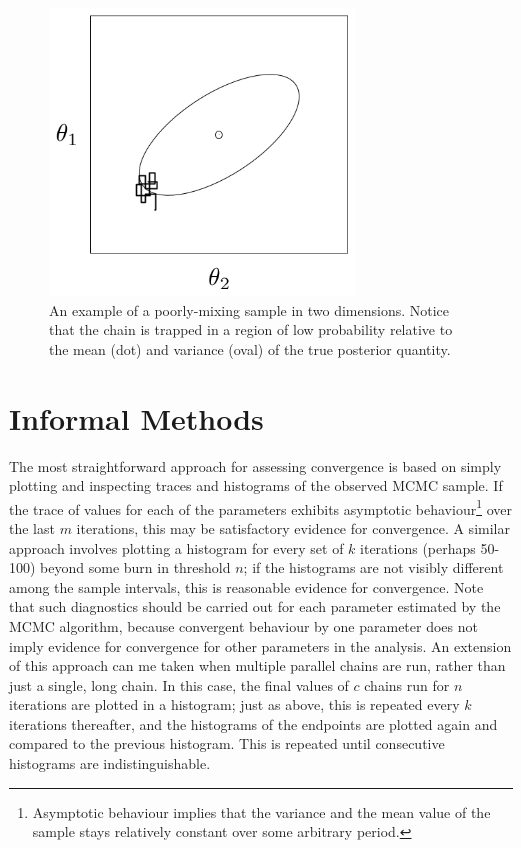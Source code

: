 \documentclass[]{book}
\begin{document}
\begin{figure}[ht]
\begin{center}
\includegraphics[height=3in]{poor_mixing.png}
\caption{An example of a poorly-mixing sample in two dimensions. Notice that the chain is trapped in a region of low probability relative to the mean (dot) and variance (oval) of the true posterior quantity.}
\label{fig:mix}
\end{center}
\end{figure}

\section*{Informal Methods}

The most straightforward approach for assessing convergence is based on simply plotting and inspecting traces and histograms of the observed MCMC sample. If the trace of values for each of the parameters exhibits asymptotic behaviour\footnote{Asymptotic behaviour implies that the variance and the mean value of the sample stays relatively constant over some arbitrary period.} over the last $m$ iterations, this may be satisfactory evidence for convergence. A similar approach involves plotting a histogram for every set of $k$ iterations (perhaps 50-100) beyond some burn in threshold $n$; if the histograms are not visibly different among the sample intervals, this is reasonable evidence for convergence. Note that such diagnostics should be carried out for each parameter estimated by the MCMC algorithm, because convergent behaviour by one parameter does not imply evidence for convergence for other parameters in the analysis. An extension of this approach can me taken when multiple parallel chains are run, rather than just a single, long chain. In this case, the final values of $c$ chains run for $n$ iterations are plotted in a histogram; just as above, this is repeated every $k$ iterations thereafter, and the histograms of the endpoints are plotted again and compared to the previous histogram. This is repeated until consecutive histograms are indistinguishable.
\end{document}
